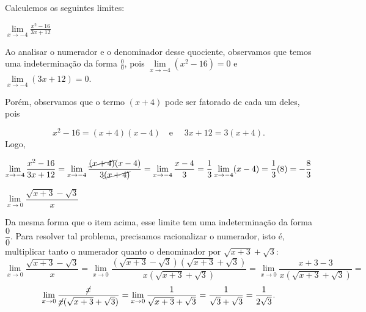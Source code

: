 \cleardoublepage\documentclass[../main.tex]{subfiles}
\begin{document}
\begin{exeresol}
  Calculemos os seguintes limites:
\begin{compactenum}[a)]
\item \( \lim\limits_{x \to -4} \frac{x^2-16}{3x+12}\)\\
\begin{resol}
Ao analisar o numerador e o denominador desse quociente, observamos que temos uma indeterminação da forma \(\frac{0}{0}\), pois \( \lim\limits_{x \to -4} (x^2-16)=0\) e \( \lim\limits_{x \to -4} (3x+12)=0\).

Porém, observamos que o termo \((x+4)\) pode ser fatorado de cada um deles, pois

\[ x^2-16=(x+4)(x-4)\quad \mbox{e } \quad 3x+12=3(x+4). \]
Logo,

\[ \lim\limits_{x \to -4} \dfrac{x^2-16}{3x+12} =\lim\limits_{x \to -4} \dfrac{\cancel{(x+4)}(x-4)}{3\cancel{(x+4)}} = \lim\limits_{x \to -4} \dfrac{x-4}{3}= \dfrac{1}{3}\lim\limits_{x \to -4} (x-4)=\dfrac{1}{3}(8)=-\dfrac{8}{3}\]
\end{resol}
\item \( \lim\limits_{x \to 0} \dfrac{\sqrt{x+3}-\sqrt{3}}{x}\)\\
\begin{resol}
Da mesma forma que o item acima, esse limite tem uma indeterminação da forma \(\dfrac{0}{0}\). Para resolver tal problema, precisamos racionalizar o numerador, isto é, multiplicar tanto o numerador quanto o denominador por \( \sqrt{x+3}+\sqrt{3}\):
\[ \lim\limits_{x \to 0} \dfrac{\sqrt{x+3}-\sqrt{3}}{x} = \lim\limits_{x \to 0}\dfrac{(\sqrt{x+3}-\sqrt{3})(\sqrt{x+3}+\sqrt{3})}{x(\sqrt{x+3}+\sqrt{3})}=\lim\limits_{x \to 0} \dfrac{x+3-3}{x(\sqrt{x+3}+\sqrt{3})} = \] \[ \lim\limits_{x \to 0} \dfrac{\cancel{x}}{\cancel{x}(\sqrt{x+3}+\sqrt{3})} = \lim\limits_{x \to 0} \dfrac{1}{\sqrt{x+3}+\sqrt{3}}= \dfrac{1}{\sqrt{3}+\sqrt{3}}= \dfrac{1}{2\sqrt{3}}. \]
\end{resol}
\end{compactenum}
\end{exeresol}
\end{document}
